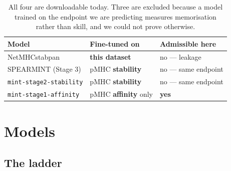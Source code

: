 \documentclass[11pt,a4paper]{article}
\begin{document}
\begin{table}[H]
\centering\small
\begin{tabular}{@{}lll@{}}
\toprule
\textbf{Model} & \textbf{Fine-tuned on} & \textbf{Admissible here} \\
\midrule
NetMHCstabpan \citep{rasmussen2016netmhcstabpan} & \textbf{this dataset} & no --- leakage \\
SPEARMINT (Stage 3) \citep{karthikeyan2026spearmint} & pMHC \textbf{stability} & no --- same endpoint \\
\texttt{mint-stage2-stability} & pMHC \textbf{stability} & no --- same endpoint \\
\texttt{mint-stage1-affinity} & pMHC \textbf{affinity} only & \textbf{yes} \\
\bottomrule
\end{tabular}
\caption{All four are downloadable today. Three are excluded because a model trained on the
endpoint we are predicting measures memorisation rather than skill, and we could not prove
otherwise.}
\end{table}

\section{Models}

\subsection{The ladder}
\end{document}
